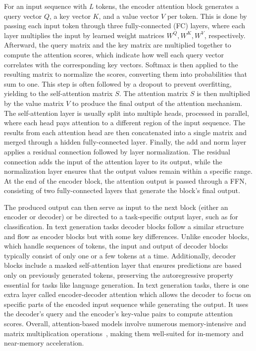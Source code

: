 For an input sequence with \textit{L} tokens, the encoder attention block generates a query vector $Q$, a key vector $K$, and a value vector $V$ per token. This is done by passing each input token through three fully-connected (FC) layers, where each layer multiplies the input by learned weight matrices $W^Q, W^K, W^V$, respectively. Afterward, the query matrix and the key matrix are multiplied together to compute the attention scores, which indicate how well each query vector correlates with the corresponding key vectors. Softmax is then applied to the resulting matrix to normalize the scores, converting them into probabilities that sum to one. This step is often followed by a dropout to prevent overfitting, yielding to the self-attention matrix $S$. The attention matrix $S$ is then multiplied by the value matrix $V$ to produce the final output of the attention mechanism. The self-attention layer is usually split into multiple heads, processed in parallel, where each head pays attention to a different region of the input sequence. The results from each attention head are then concatenated into a single matrix and merged through a hidden fully-connected layer. Finally, the add and norm layer applies a residual connection followed by layer normalization. The residual connection adds the input of the attention layer to its output, while the normalization layer ensures that the output values remain within a specific range. At the end of the encoder block, the attention output is passed through a FFN, consisting of two fully-connected layers that generate the block’s final output.


The produced output can then serve as input to the next block (either an encoder or decoder) or be directed to a task-specific output layer, such as for classification. In text generation tasks decoder blocks follow a similar structure and flow as encoder blocks but with some key differences. Unlike encoder blocks, which handle sequences of tokens, the input and output of decoder blocks typically consist of only one or a few tokens at a time. Additionally, decoder blocks include a masked self-attention layer that ensures predictions are based only on previously generated tokens, preserving the autoregressive property essential for tasks like language generation. In text generation tasks, there is one extra layer called encoder-decoder attention which allows the decoder to focus on specific parts of the encoded input sequence while generating the output. It uses the decoder's query and the encoder's key-value pairs to compute attention scores. Overall, attention-based models involve numerous memory-intensive and matrix multiplication operations~\cite{transpim, A3, mnnfast, interstellar}, making them well-suited for in-memory and near-memory acceleration.

